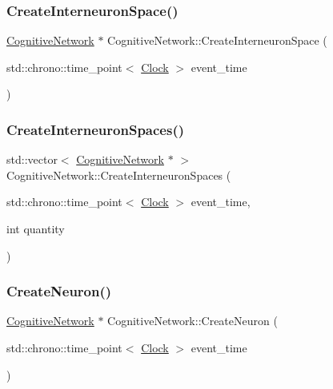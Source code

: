 \subsubsection{\texorpdfstring{Create\+Interneuron\+Space()}{CreateInterneuronSpace()}}
{\footnotesize\ttfamily \mbox{\hyperlink{classCognitiveNetwork}{Cognitive\+Network}} $\ast$ Cognitive\+Network\+::\+Create\+Interneuron\+Space (\begin{DoxyParamCaption}\item[{std\+::chrono\+::time\+\_\+point$<$ \mbox{\hyperlink{universe_8h_a0ef8d951d1ca5ab3cfaf7ab4c7a6fd80}{Clock}} $>$}]{event\+\_\+time }\end{DoxyParamCaption})}

\mbox{\label{classCognitiveNetwork_a2d671451d659079d5efb5cda10e48827}} 
\subsubsection{\texorpdfstring{Create\+Interneuron\+Spaces()}{CreateInterneuronSpaces()}}
{\footnotesize\ttfamily std\+::vector$<$ \mbox{\hyperlink{classCognitiveNetwork}{Cognitive\+Network}} $\ast$ $>$ Cognitive\+Network\+::\+Create\+Interneuron\+Spaces (\begin{DoxyParamCaption}\item[{std\+::chrono\+::time\+\_\+point$<$ \mbox{\hyperlink{universe_8h_a0ef8d951d1ca5ab3cfaf7ab4c7a6fd80}{Clock}} $>$}]{event\+\_\+time,  }\item[{int}]{quantity }\end{DoxyParamCaption})}

\mbox{\label{classCognitiveNetwork_a9b5fcaf824d5b587775e7c44630affe6}} 
\subsubsection{\texorpdfstring{Create\+Neuron()}{CreateNeuron()}}
{\footnotesize\ttfamily \mbox{\hyperlink{classCognitiveNetwork}{Cognitive\+Network}} $\ast$ Cognitive\+Network\+::\+Create\+Neuron (\begin{DoxyParamCaption}\item[{std\+::chrono\+::time\+\_\+point$<$ \mbox{\hyperlink{universe_8h_a0ef8d951d1ca5ab3cfaf7ab4c7a6fd80}{Clock}} $>$}]{event\+\_\+time }\end{DoxyParamCaption})}

